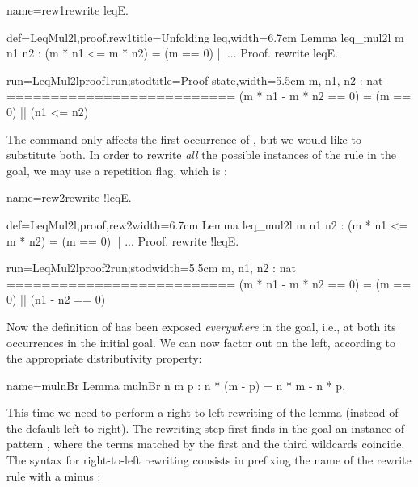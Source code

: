 \begin{coqdef}{name=rew1}rewrite leqE.\end{coqdef}
\begin{coq-left}{def=LeqMul2l,proof,rew1}{title=Unfolding leq,width=6.7cm}
Lemma leq_mul2l m n1 n2 :
 (m * n1 <= m * n2) = (m == 0) || ...
Proof.
rewrite leqE.
\end{coq-left}
\begin{coqout-right}{run=LeqMul2lproof1run;stod}{title=Proof state,width=5.5cm}
m, n1, n2 : nat
==========================
(m * n1 - m * n2 == 0) =
  (m == 0) || (n1 <= n2)
\end{coqout-right}

The command  only affects the first
occurrence of \C{<=}, but we would like to substitute both. In order to
rewrite \emph{all} the possible instances of the rule in the goal, we
may use a repetition flag, which is \C{!}:

\begin{coqdef}{name=rew2}rewrite !leqE.\end{coqdef}
\begin{coq-left}{def=LeqMul2l,proof,rew2}{width=6.7cm}
Lemma leq_mul2l m n1 n2 :
 (m * n1 <= m * n2) = (m == 0) || ...
Proof.
rewrite !leqE.
\end{coq-left}
\begin{coqout-right}{run=LeqMul2lproof2run;stod}{width=5.5cm}
m, n1, n2 : nat
==========================
(m * n1 - m * n2 == 0) =
  (m == 0) || (n1 - n2 == 0)
\end{coqout-right}

Now the definition of \C{<=} has been exposed
\emph{everywhere} in the goal, i.e., at both its occurrences in the
initial goal. We can now factor out  on the left, according to the
appropriate distributivity property:

\begin{coq}{name=mulnBr}{}
Lemma mulnBr n m p : n * (m - p) = n * m - n * p.
\end{coq}

This time we need to perform a right-to-left rewriting of the
 lemma (instead of the
default left-to-right). The rewriting step first finds in the goal an
instance of pattern \C{(_ * _ - _ * _)}, where the terms matched by
the first and the third wildcards coincide. The syntax for
right-to-left rewriting consists in prefixing the
name of the rewrite rule
with a minus \C{-}:


